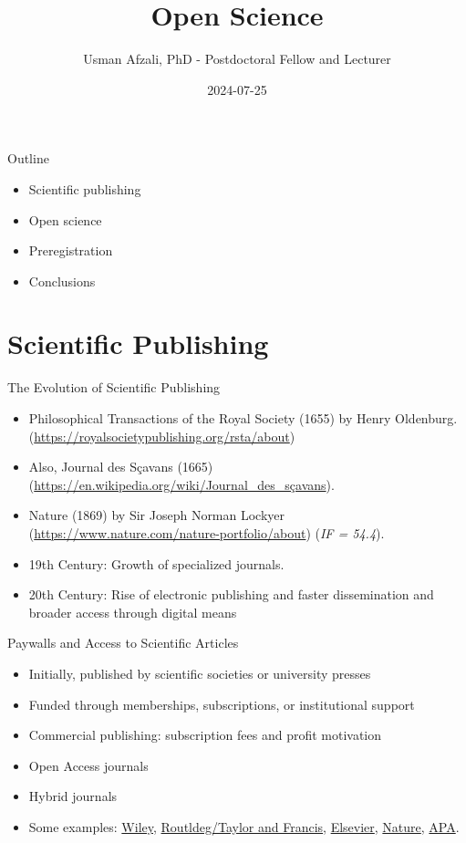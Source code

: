 \documentclass[
  ignorenonframetext,
  aspectratio=169,
]{beamer}
\title{Open Science}
\author{Usman Afzali, PhD - Postdoctoral Fellow and Lecturer}
\date{2024-07-25}
\institute{University of Canterbury}
\providecommand{\tightlist}{%
  \setlength{\itemsep}{0pt}\setlength{\parskip}{0pt}}\usepackage{longtable,booktabs,array}
\begin{document}
\frame{\titlepage}

\begin{frame}{Outline}
\label{outline}
\begin{itemize}
\tightlist
\item
  Scientific publishing
\item
  Open science
\item
  Preregistration
\item
  Conclusions
\end{itemize}
\end{frame}

\section{Scientific Publishing}\label{scientific-publishing}

\begin{frame}{The Evolution of Scientific Publishing}
\label{the-evolution-of-scientific-publishing}
\begin{itemize}[<+->]
\tightlist
\item
  Philosophical Transactions of the Royal Society (1655) by Henry
  Oldenburg. (\url{https://royalsocietypublishing.org/rsta/about})
\item
  Also, Journal des Sçavans (1665)
  (\url{https://en.wikipedia.org/wiki/Journal_des_sçavans}).
\item
  Nature (1869) by Sir Joseph Norman Lockyer
  (\url{https://www.nature.com/nature-portfolio/about}) (\emph{IF =
  54.4}).
\item
  19th Century: Growth of specialized journals.
\item
  20th Century: Rise of electronic publishing and faster dissemination
  and broader access through digital means
\end{itemize}
\end{frame}

\begin{frame}{Paywalls and Access to Scientific Articles}
\label{paywalls-and-access-to-scientific-articles}
\begin{itemize}[<+->]
\tightlist
\item
  Initially, published by scientific societies or university presses
\item
  Funded through memberships, subscriptions, or institutional support
\item
  Commercial publishing: subscription fees and profit motivation
\item
  Open Access journals
\item
  Hybrid journals
\item
  Some examples: \href{https://onlinelibrary.wiley.com}{Wiley},
  \href{https://www.taylorfrancis.com}{Routldeg/Taylor and Francis},
  \href{https://www.elsevier.com/products/sciencedirect/journals}{Elsevier},
  \href{https://www.nature.com/nature/journal-impact}{Nature},
  \href{https://www.apa.org/pubs/journals}{APA}.
\end{itemize}
\end{frame}
\end{document}
